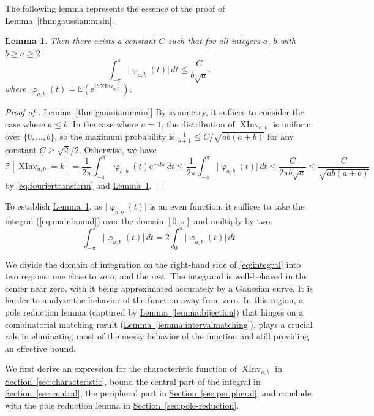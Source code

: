 \documentclass[11pt]{article}
\numberwithin{equation}{section}
\newtheorem{lemma}[theorem]{Lemma}
\theoremstyle{definition}
\theoremstyle{plain}
\newcommand{\eee}{\mathrm e}
\newcommand{\expref}[2]{\hyperref[#2]{#1~\ref{#2}}}
\renewcommand{\Pr}{\mathbb{P}}
\newcommand{\Expect}{\mathbb{E}}
\newcommand{\XInvD}{\XInv}
\DeclareMathOperator{\charfn}{\varphi}
\DeclareMathOperator{\XInv}{XInv}
\begin{document}
The following lemma represents the essence of the proof of 
 \expref{Lemma}{thm:gaussian:main}.
\begin{lemma}
    \label{thm:integral}
    Then there exists a constant $C$ such that for all integers $a$, $b$ with $b \ge a \ge 2$
      \begin{equation}
        \label{eq:mainbound}
        \int_{-\pi}^{\pi} \lvert \charfn_{a,b}(t)\rvert\,dt \le \frac{C}{b\sqrt{a}}.
    \end{equation}  
where $\charfn_{a,b}(t) \doteq \Expect(\eee^{it\XInvD_{a,b}})$. 
\end{lemma}
\begin{proof}[Proof of \expref{Lemma}{thm:gaussian:main}]
By symmetry, it suffices to consider the case where $a \le b$. In the case where $a=1$, the distribution of $\XInvD_{a,b}$ is uniform over $\{0,\dots,b\}$, so the maximum probability is $\frac{1}{b+1} \le C/\sqrt{ab(a+b)}$ for any constant $C \ge \sqrt{2}/2$. Otherwise, 
we have
\[ \Pr[\XInvD_{a,b}=k] = \frac{1}{2\pi} \int_{-\pi}^{\pi}\charfn_{a,b}(t)\eee^{-itk}\,dt \le \frac{1}{2\pi} \int_{-\pi}^{\pi} \lvert\charfn_{a,b}(t)\rvert\,dt \le \frac{C}{2\pi b\sqrt{a}} \le \frac{C}{\sqrt{ab(a+b)}} \]
by \eqref{eq:fouriertransform} and \expref{Lemma}{thm:integral}.
\end{proof}

To establish \expref{Lemma}{thm:integral}, as $\lvert \charfn_{a,b}(t) \rvert$ is an even function, it suffices to take the integral (\ref{eq:mainbound}) over the domain $[0,\pi]$ and multiply by two: 
\begin{equation}
    \label{eq:integral}
    \int_{-\pi}^{\pi} \lvert \charfn_{a,b}(t)\rvert\,dt 
    = 2 \int_0^{\pi} \lvert \charfn_{a,b}(t)\rvert\,dt 
\end{equation}  

We divide the domain of integration on the right-hand side of \eqref{eq:integral} into two regions: one close to zero, and the rest. The integrand is well-behaved in the center near zero, with it being approximated accurately by a Gaussian curve. It is harder to analyze the behavior of the function away from zero. In this region, a pole reduction lemma (captured by \expref{Lemma}{lemma:bijection}) that hinges on a combinatorial matching result (\expref{Lemma}{lemma:intervalmatching}), plays a crucial role in eliminating most of the messy behavior of the function and still providing an effective bound.

We first derive an expression for the characteristic function of $\XInvD_{a,b}$ in \expref{Section}{sec:characteristic}, bound the central part of the integral in \expref{Section}{sec:central}, the peripheral part in \expref{Section}{sec:peripheral}, and conclude with the pole reduction lemma in \expref{Section}{sec:pole-reduction}.
\end{document}
